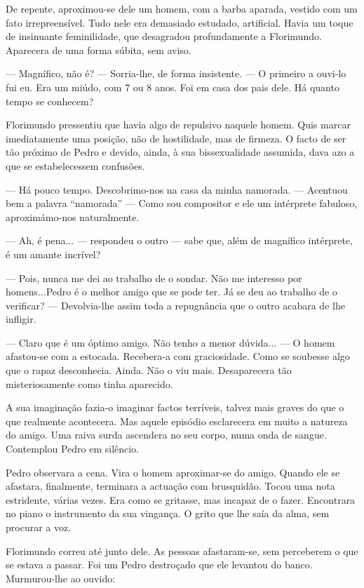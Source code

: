 De repente, aproximou-se dele um homem, com a barba aparada, vestido com
um fato irrepreensível. Tudo nele era demasiado estudado, artificial.
Havia um toque de insinuante feminilidade, que desagradou profundamente
a Florimundo. Aparecera de uma forma súbita, sem aviso.

--- Magnífico, não é? --- Sorria-lhe, de forma insistente. --- O primeiro a
ouvi-lo fui eu. Era um miúdo, com 7 ou 8 anos. Foi em casa dos pais
dele. Há quanto tempo se conhecem?

Florimundo pressentiu que havia algo de repulsivo naquele homem. Quis
marcar imediatamente uma posição, não de hostilidade, mas de firmeza. O
facto de ser tão próximo de Pedro e devido, ainda, à sua bissexualidade
assumida, dava azo a que se estabelecessem confusões.

--- Há pouco tempo. Descobrimo-nos na casa da minha namorada. --- Acentuou
bem a palavra ``namorada'' --- Como sou compositor e ele um intérprete
fabuloso, aproximámo-nos naturalmente.

--- Ah, é pena... --- respondeu o outro --- sabe que, além de magnífico
intérprete, é um amante incrível?

--- Pois, nunca me dei ao trabalho de o sondar. Não me interesso por
homens...Pedro é o melhor amigo que se pode ter. Já se deu ao trabalho
de o verificar? --- Devolvia-lhe assim toda a repugnância que o outro
acabara de lhe infligir.

--- Claro que é um óptimo amigo. Não tenho a menor dúvida... --- O homem
afastou-se com a estocada. Recebera-a com graciosidade. Como se soubesse
algo que o rapaz desconhecia. Ainda. Não o viu mais. Desaparecera tão
misteriosamente como tinha aparecido.

A sua imaginação fazia-o imaginar factos terríveis, talvez mais graves
do que o que realmente acontecera. Mas aquele episódio esclarecera em
muito a natureza do amigo. Uma raiva surda ascendera no seu corpo, numa
onda de sangue. Contemplou Pedro em silêncio.

Pedro observara a cena. Vira o homem aproximar-se do amigo. Quando ele
se afastara, finalmente, terminara a actuação com brusquidão. Tocou uma
nota estridente, várias vezes. Era como se gritasse, mas incapaz de o
fazer. Encontrara no piano o instrumento da sua vingança. O grito que
lhe saía da alma, sem procurar a voz.

Florimundo correu até junto dele. As pessoas afastaram-se, sem
perceberem o que se estava a passar. Foi um Pedro destroçado que ele
levantou do banco. Murmurou-lhe ao ouvido:

